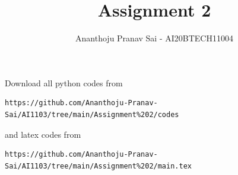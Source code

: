 \documentclass[journal,12pt,twocolumn]{IEEEtran}
\DeclareMathOperator*{\Res}{Res}
\begin{document}
\newcommand{\BEQA}{\begin{eqnarray}}
\newcommand{\EEQA}{\end{eqnarray}}
\newcommand{\define}{\stackrel{\triangle}{=}}

\raggedbottom
\setlength{\parindent}{0pt}
\providecommand{\mbf}{\mathbf}
\providecommand{\pr}[1]{\ensuremath{\Pr\left(#1\right)}}
\providecommand{\qfunc}[1]{\ensuremath{Q\left(#1\right)}}
\providecommand{\sbrak}[1]{\ensuremath{{}\left[#1\right]}}
\providecommand{\lsbrak}[1]{\ensuremath{{}\left[#1\right.}}
\providecommand{\rsbrak}[1]{\ensuremath{{}\left.#1\right]}}
\providecommand{\brak}[1]{\ensuremath{\left(#1\right)}}
\providecommand{\lbrak}[1]{\ensuremath{\left(#1\right.}}
\providecommand{\rbrak}[1]{\ensuremath{\left.#1\right)}}
\providecommand{\cbrak}[1]{\ensuremath{\left\{#1\right\}}}
\providecommand{\lcbrak}[1]{\ensuremath{\left\{#1\right.}}
\providecommand{\rcbrak}[1]{\ensuremath{\left.#1\right\}}}
\theoremstyle{remark}
\newtheorem{rem}{Remark}
\newcommand{\sgn}{\mathop{\mathrm{sgn}}}
\providecommand{\abs}[1]{\vert#1\vert}
\providecommand{\res}[1]{\Res\displaylimits_{#1}} 
\providecommand{\norm}[1]{\lVert#1\rVert}
\providecommand{\mtx}[1]{\mathbf{#1}}
\providecommand{\mean}[1]{E[ #1 ]}
\providecommand{\fourier}{\overset{\mathcal{F}}{ \rightleftharpoons}}
\providecommand{\system}{\overset{\mathcal{H}}{ \longleftrightarrow}}
\newcommand{\solution}{\noindent \textbf{Solution: }}
\newcommand{\cosec}{\,\text{cosec}\,}
\providecommand{\dec}[2]{\ensuremath{\overset{#1}{\underset{#2}{\gtrless}}}}
\newcommand{\myvec}[1]{\ensuremath{\begin{pmatrix}#1\end{pmatrix}}}
\newcommand{\mydet}[1]{\ensuremath{\begin{vmatrix}#1\end{vmatrix}}}
\makeatletter
{}
\makeatother
\let\StandardTheFigure\thefigure
\let\vec\mathbf
\renewcommand{\thefigure}{\theproblem}
\def\putbox#1#2#3{\makebox[0in][l]{\makebox[#1][l]{}\raisebox{\baselineskip}[0in][0in]{\raisebox{#2}[0in][0in]{#3}}}}
     \def\rightbox#1{\makebox[0in][r]{#1}}
     \def\centbox#1{\makebox[0in]{#1}}
     \def\topbox#1{\raisebox{-\baselineskip}[0in][0in]{#1}}
     \def\midbox#1{\raisebox{-0.5\baselineskip}[0in][0in]{#1}}
\vspace{3cm}
\title{Assignment 2}
\author{Ananthoju Pranav Sai - AI20BTECH11004}
\maketitle
\newpage
\bigskip
\renewcommand{\thefigure}{\theenumi}
\renewcommand{\thetable}{\theenumi}
Download all python codes from 
\begin{lstlisting}
https://github.com/Ananthoju-Pranav-Sai/AI1103/tree/main/Assignment%202/codes
\end{lstlisting}
%
and latex codes from 
%
\begin{lstlisting}
https://github.com/Ananthoju-Pranav-Sai/AI1103/tree/main/Assignment%202/main.tex
\end{lstlisting}
\end{document}
